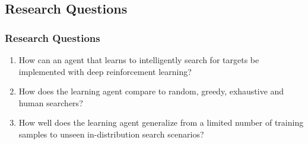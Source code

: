 \subsection{Research Questions}

\begin{frame}
    \frametitle{Research Questions}
    \begin{enumerate}
        \item How can an agent that learns to intelligently search for targets be implemented with deep reinforcement learning?
        \item How does the learning agent compare to random, greedy, exhaustive and human searchers?
        \item How well does the learning agent generalize from a limited number of training samples to unseen in-distribution search scenarios?
    \end{enumerate}    
\end{frame}
